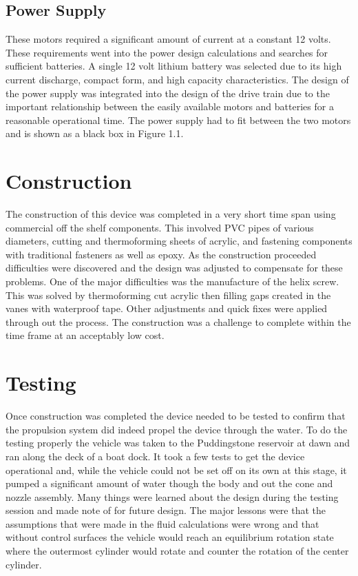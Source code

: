 \documentclass{report}
\begin{document}
\subsection{Power Supply}
These motors required a significant amount of current at a constant 12 volts. These requirements went into the power design calculations and searches for sufficient batteries. A single 12 volt lithium battery was selected due to its high current discharge, compact form, and high capacity characteristics. The design of the power supply was integrated into the design of the drive train due to the important relationship between the easily available motors and batteries for a reasonable operational time. The power supply had to fit between the two motors and is shown as a black box in Figure 1.1.
\section{Construction}
The construction of this device was completed in a very short time span using commercial off the shelf components. This involved PVC pipes of various diameters, cutting and thermoforming sheets of acrylic, and fastening components with traditional fasteners as well as epoxy. As the construction proceeded difficulties were discovered and the design was adjusted to compensate for these problems. One of the major difficulties was the manufacture of the helix screw. This was solved by thermoforming cut acrylic then filling gaps created in the vanes with waterproof tape. Other adjustments and quick fixes were applied through out the process. The construction was a challenge to complete within the time frame at an acceptably low cost.  
\section{Testing}
Once construction was completed the device needed to be tested to confirm that the propulsion system did indeed propel the device through the water. To do the testing properly the vehicle was taken to the Puddingstone reservoir at dawn and ran along the deck of a boat dock. It took a few tests to get the device operational and, while the vehicle could not be set off on its own at this stage, it pumped a significant amount of water though the body and out the cone and nozzle assembly. Many things were learned about the design during the testing session and made note of for future design. The major lessons were that the assumptions that were made in the fluid calculations were wrong and that without control surfaces the vehicle would reach an equilibrium rotation state where the outermost cylinder would rotate and counter the rotation of the center cylinder. 
\end{document}
